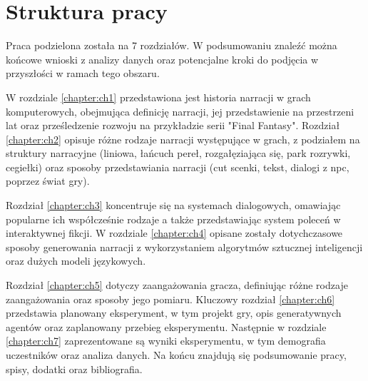 \section*{Struktura pracy}

Praca podzielona została na 7 rozdziałów. W podsumowaniu znaleźć można końcowe wnioski z analizy danych oraz
potencjalne kroki do podjęcia w przyszłości w ramach tego obszaru.

W rozdziale \ref{chapter:ch1} przedstawiona jest historia narracji w grach komputerowych, obejmująca definicję narracji, jej
przedstawienie na przestrzeni lat oraz prześledzenie rozwoju na przykładzie serii "Final Fantasy". Rozdział \ref{chapter:ch2}
opisuje różne rodzaje narracji występujące w grach, z podziałem na struktury narracyjne (liniowa, łańcuch pereł,
rozgałęziająca się, park rozrywki, cegiełki) oraz sposoby przedstawiania narracji (cut scenki, tekst, dialogi
z \gls{npc}, poprzez świat gry).

Rozdział \ref{chapter:ch3} koncentruje się na systemach dialogowych, omawiając popularne ich współcześnie rodzaje a także
przedstawiając system poleceń w interaktywnej fikcji. W rozdziale \ref{chapter:ch4} opisane zostały dotychczasowe sposoby
generowania narracji z wykorzystaniem algorytmów sztucznej inteligencji oraz dużych modeli językowych.

Rozdział \ref{chapter:ch5} dotyczy zaangażowania gracza, definiując różne rodzaje zaangażowania oraz sposoby jego pomiaru. Kluczowy
rozdział \ref{chapter:ch6} przedstawia planowany eksperyment, w tym projekt gry, opis generatywnych agentów oraz zaplanowany
przebieg eksperymentu. Następnie w rozdziale \ref{chapter:ch7} zaprezentowane są wyniki eksperymentu, w tym demografia uczestników
oraz analiza danych. Na końcu znajdują się podsumowanie pracy, spisy, dodatki oraz bibliografia.